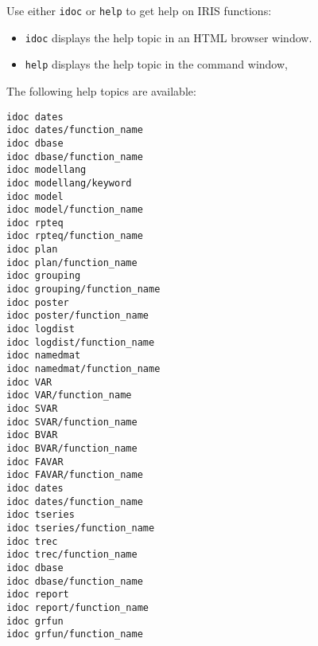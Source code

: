 

	Use either \texttt{idoc} or \texttt{help} to get help on IRIS functions:

\begin{itemize}
\itemsep1pt\parskip0pt
\item
  \texttt{idoc} displays the help topic in an HTML browser window.
\item
  \texttt{help} displays the help topic in the command window,
\end{itemize}

The following help topics are available:

\begin{verbatim}
idoc dates
idoc dates/function_name
idoc dbase
idoc dbase/function_name
idoc modellang
idoc modellang/keyword
idoc model
idoc model/function_name
idoc rpteq
idoc rpteq/function_name
idoc plan
idoc plan/function_name
idoc grouping
idoc grouping/function_name
idoc poster
idoc poster/function_name
idoc logdist
idoc logdist/function_name
idoc namedmat
idoc namedmat/function_name
idoc VAR
idoc VAR/function_name
idoc SVAR
idoc SVAR/function_name
idoc BVAR
idoc BVAR/function_name
idoc FAVAR
idoc FAVAR/function_name
idoc dates
idoc dates/function_name
idoc tseries
idoc tseries/function_name
idoc trec
idoc trec/function_name
idoc dbase
idoc dbase/function_name
idoc report
idoc report/function_name
idoc grfun
idoc grfun/function_name
\end{verbatim}



